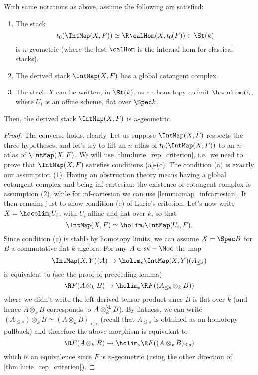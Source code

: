         \begin{thm}
            \label{thm:derived_stack_geometric}
            With same notations as above, assume the following are satisfied:
            \begin{enumerate}[label=(\arabic*)]
                \item The stack \[t_0(\IntMap(X, F)) \simeq \R\calHom(X, t_0(F)) \in \St(k) \] is $n$-geometric (where the last $\calHom$ is the internal hom for classical stacks).
                \item The derived stack $\IntMap(X, F)$ has a global cotangent complex.
                \item The stack $X$ can be written, in $\St(k)$, as an homotopy colimit $\hocolim_i U_i$, where $U_i$ is an affine scheme, flat over $\Spec k$.
            \end{enumerate}
            Then, the derived stack $\IntMap(X, F)$ is $n$-geometric.
        \end{thm}
        \begin{proof}
            The converse holds, clearly. Let us suppose $\IntMap(X, F)$ respects the three hypotheses, and let's try to lift an $n$-atlas of $t_0(\IntMap(X, F))$ to an $n$-atlas of $\IntMap(X, F)$. We will use \cref{thm:lurie_rep_criterion}, i.e.\ we need to prove that $\IntMap(X, F)$ satisfies conditions (a)-(c). The condition (a) is exactly our assumption (1). Having an obstruction theory means having a global cotangent complex and being inf-cartesian: the existence of cotangent complex is assumption (2), while for inf-cartesian we can use \cref{lemma:map_infcartesian}.
            It then remains just to show condition (c) of Lurie's criterion. Let's now write $X = \hocolim_i U_i$, with $U_i$ affine and flat over $k$, so that \[\IntMap(X, F) \simeq \holim_i \IntMap(U_i, F). \] Since condition (c) is stable by homotopy limits, we can assume $X = \Spec B$ for $B$ a commutative flat $k$-algebra. For any $A \in sk-\Mod$ the map \[\IntMap(X, Y)(A) \to \holim_s \IntMap(X, Y)(A_{\leq s}) \] is equivalent to (see the proof of preceeding lemma) \[\R F(A \otimes_k B) \to \holim_s \R F((A_{\leq s} \otimes_k B)) \] where we didn't write the left-derived tensor product since $B$ is flat over $k$ (and hence $A \otimes_k B$ corresponds to $A \otimes_k^{\L} B$). By flatness, we can write $(A_{\leq s}) \otimes_k B \simeq (A \otimes_k B)_{\leq s}$ (recall that $A_{\leq s}$ is obtained as an homotopy pullback) and therefore the above morphism is equivalent to \[\R F(A \otimes_k B) \to \holim_s \R F( (A \otimes_k B)_{\leq s} ) \] which is an equivalence since $F$ is $n$-geometric (using the other direction of \cref{thm:lurie_rep_criterion}).
        \end{proof}

